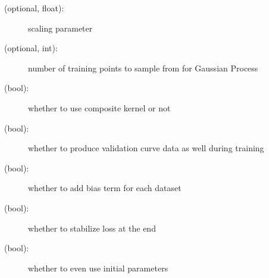 \documentclass[letterpaper,10pt,english,openany,oneside]{sphinxmanual}
\begin{document}
\begin{fulllineitems}
\begin{description}
\begin{description}
\item[{ (optional, float):}] \leavevmode
scaling parameter

\item[{ (optional, int):}] \leavevmode
number of training points to sample from for Gaussian Process

\item[{ (bool):}] \leavevmode
whether to use composite kernel or not

\item[{ (bool):}] \leavevmode
whether to produce validation curve data as well during training

\item[{ (bool):}] \leavevmode
whether to add bias term for each dataset

\item[{ (bool):}] \leavevmode
whether to stabilize loss at the end

\item[{ (bool):}] \leavevmode
whether to even use initial parameters

\end{description}

\end{description}

\end{fulllineitems}

\end{document}
